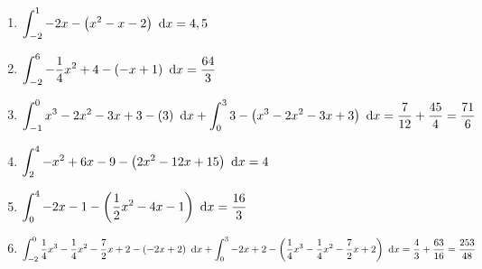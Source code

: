 \begin{Answer}[ref=flaecheZwFkt1]\\
	\begin{enumerate}[label=\alph*)]
		\item \(\displaystyle\int_{-2}^1 -2x-\left(x^2-x-2\right) \ \text{d} x=4,5\)
		\item \(\displaystyle\int_{-2}^{6} -\frac{1}{4}x^2+4-\left(-x+1\right) \ \text{d} x=\frac{64}{3}\)
		\item \(\displaystyle\int_{-1}^{0} x^3-2x^2-3x+3-\left(3\right) \ \text{d} x+\int_{0}^{3} 3-\left(x^3-2x^2-3x+3\right) \ \text{d} x=\frac{7}{12}+\frac{45}{4}=\frac{71}{6}\)
		\item \(\displaystyle\int_{2}^{4} -x^2+6x-9-\left(2x^2-12x+15\right) \ \text{d} x=4\)
		\item \(\displaystyle\int_{0}^{4} -2x-1-\left(\frac{1}{2}x^2-4x-1\right) \ \text{d} x=\frac{16}{3}\)
		\item \(\displaystyle\int_{-2}^{0} \frac{1}{4}x^3-\frac{1}{4}x^2-\frac{7}{2}x+2-\left(-2x+2\right) \ \text{d} x+\int_{0}^{3} -2x+2-\left(\frac{1}{4}x^3-\frac{1}{4}x^2-\frac{7}{2}x+2\right) \ \text{d} x=\frac{4}{3}+\frac{63}{16}=\frac{253}{48}\)
	\end{enumerate}
\end{Answer}